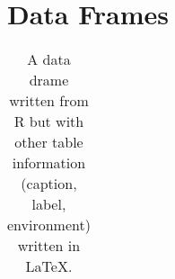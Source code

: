 \documentclass{article}
\begin{document}


\section{Data Frames}

\begin{table}[h!]
\caption{A data drame written from R but with other table information (caption, label, environment) written in \LaTeX.}\label{df1}
\begin{center}
\begin{tabular}{l r c}
\hline

\hline
\end{tabular}
\end{center}
\end{table}


\end{document}
